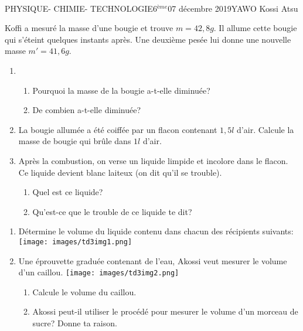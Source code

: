 \documentclass[12pt,a4paper]{book}
\newcommand{\prof}{YAWO Kossi Atsu}
\newcommand{\matiere}{\\PHYSIQUE- CHIMIE- TECHNOLOGIE}
\newcommand{\classe}{6$^{ème}$}
\begin{document}
\newpage

\begin{td}{\matiere}{\classe}{07 décembre 2019}{\prof}
\begin{exo}
Koffi a mesuré la masse d'une bougie et trouve $m=42,8g$. Il allume cette bougie qui s'éteint quelques instants après. Une deuxième pesée lui donne une nouvelle masse $m'=41,6g$.
\begin{enumerate}
\item \begin{enumerate}
\item Pourquoi la masse de la bougie a-t-elle diminuée?
\item De combien a-t-elle diminuée?
\end{enumerate}
\item La bougie allumée a été coiffée par un flacon contenant $1,5l$ d'air. Calcule la masse de bougie qui brûle dans $1l$ d'air.
\item Après la combustion, on verse un liquide limpide et incolore dans le flacon. Ce liquide devient blanc laiteux (on dit qu'il se trouble).
\begin{enumerate}
\item Quel est ce liquide?
\item Qu'est-ce que le trouble de ce liquide te dit?
\end{enumerate}
\end{enumerate}
\end{exo}

\begin{exo}
\begin{enumerate}
\item Détermine le volume du liquide contenu dans chacun des récipients suivants:
\texttt{[image: images/td3img1.png]}
\item Une éprouvette graduée contenant de l'eau, Akossi veut mesurer le volume d'un caillou.
\texttt{[image: images/td3img2.png]}
\begin{enumerate}
\item Calcule le volume du caillou.
\item Akossi peut-il utiliser le procédé pour mesurer le volume d'un morceau de sucre? Donne ta raison.
\end{enumerate}
\end{enumerate}
\end{exo}


\end{td}
\end{document}
